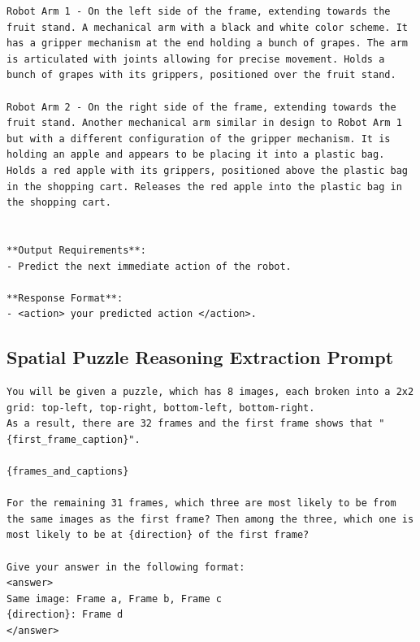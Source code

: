 \begin{tcolorbox}[colback=nvidiagreen!3,colframe=nvidiagreen!75!white,title=\textsc{AgiBot Reasoning Extraction Prompt},left=0.5ex,right=0.5ex,top=0.5ex,bottom=0.5ex]
\begin{Verbatim}[breaklines=true, breaksymbolleft={}, breaksymbolright={}]
Robot Arm 1 - On the left side of the frame, extending towards the fruit stand. A mechanical arm with a black and white color scheme. It has a gripper mechanism at the end holding a bunch of grapes. The arm is articulated with joints allowing for precise movement. Holds a bunch of grapes with its grippers, positioned over the fruit stand.

Robot Arm 2 - On the right side of the frame, extending towards the fruit stand. Another mechanical arm similar in design to Robot Arm 1 but with a different configuration of the gripper mechanism. It is holding an apple and appears to be placing it into a plastic bag. Holds a red apple with its grippers, positioned above the plastic bag in the shopping cart. Releases the red apple into the plastic bag in the shopping cart.


**Output Requirements**:
- Predict the next immediate action of the robot.

**Response Format**:
- <action> your predicted action </action>.
\end{Verbatim}
\label{prompt:agibot_reasoning}
\end{tcolorbox}


\subsection{Spatial Puzzle Reasoning Extraction Prompt}

\begin{tcolorbox}[colback=nvidiagreen!3,colframe=nvidiagreen!75!white,title=\textsc{Spatial Puzzle Reasoning Extraction Prompt},left=0.5ex,right=0.5ex,top=0.5ex,bottom=0.5ex]
\fontsize{9.}{9.}\selectfont
\begin{Verbatim}[breaklines=true, breaksymbolleft={}, breaksymbolright={}]
You will be given a puzzle, which has 8 images, each broken into a 2x2 grid: top-left, top-right, bottom-left, bottom-right.
As a result, there are 32 frames and the first frame shows that "{first_frame_caption}".

{frames_and_captions}

For the remaining 31 frames, which three are most likely to be from the same images as the first frame? Then among the three, which one is most likely to be at {direction} of the first frame?

Give your answer in the following format:
<answer>
Same image: Frame a, Frame b, Frame c
{direction}: Frame d
</answer>
\end{Verbatim}
\label{prompt:puzzle_reasoning_prompt}
\end{tcolorbox}



